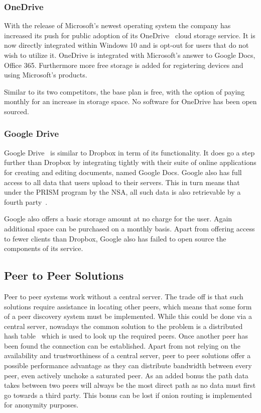 \subsubsection{OneDrive}
\label{subs:OneDrive}

With the release of Microsoft's newest operating system the company has increased its push for public adoption of its OneDrive~\cite{web:site:onedrive} cloud storage service.
It is now directly integrated within Windows 10 and is opt-out for users that do not wish to utilize it.
OneDrive is integrated with Microsoft's answer to Google Docs, Office 365.
Furthermore more free storage is added for registering devices and using Microsoft's products.

Similar to its two competitors, the base plan is free, with the option of paying monthly for an increase in storage space.
No software for OneDrive has been open sourced.

\subsubsection{Google Drive}
\label{subs:Google Drive}

Google Drive~\cite{web:site:gdrive} is similar to Dropbox in term of its functionality.
It does go a step further than Dropbox by integrating tightly with their suite of online applications for creating and editing documents, named Google Docs.
Google also has full access to all data that users upload to their servers.
This in turn means that under the PRISM program by the NSA, all such data is also retrievable by a fourth party~\cite{web:site:rt:google}.

Google also offers a basic storage amount at no charge for the user.
Again additional space can be purchased on a monthly basis.
Apart from offering access to fewer clients than Dropbox, Google also has failed to open source the components of its service.

\subsection{Peer to Peer Solutions}
\label{sub:Peer to Peer Solutions}

Peer to peer systems work without a central server.
The trade off is that such solutions require assistance in locating other peers, which means that some form of a peer discovery system must be implemented.
While this could be done via a central server, nowadays the common solution to the problem is a distributed hash table~\cite{ratnasamy2001scalable} which is used to look up the required peers.
Once another peer has been found the connection can be established.
Apart from not relying on the availability and trustworthiness of a central server, peer to peer solutions offer a possible performance advantage as they can distribute bandwidth between every peer, even actively unchoke a saturated peer.
As an added bonus the path data takes between two peers will always be the most direct path as no data must first go towards a third party.
This bonus can be lost if onion routing is implemented for anonymity purposes.

